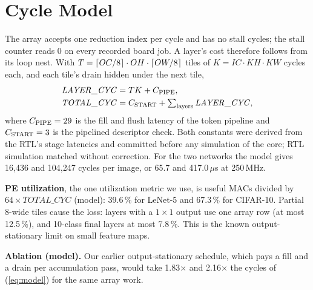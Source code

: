\section{Cycle Model}\label{sec:model}
The array accepts one reduction index per cycle and has no stall cycles;
the stall counter reads 0 on every recorded board job. A layer's cost
therefore follows from its loop nest.
With
$T = \left\lceil OC/8 \right\rceil \cdot OH \cdot \left\lceil OW/8 \right\rceil$ tiles of
$K = IC \cdot KH \cdot KW$ cycles each, and each tile's drain hidden under
the next tile,
\begin{align}
\mathit{LAYER\_CYC} &= T K + C_{\mathrm{PIPE}}, \label{eq:model}\\
\mathit{TOTAL\_CYC} &= C_{\mathrm{START}} + \textstyle\sum_{\text{layers}} \mathit{LAYER\_CYC},\nonumber
\end{align}
where $C_{\mathrm{PIPE}} = 29$ is the fill and flush latency of the token pipeline and
$C_{\mathrm{START}} = 3$ is the pipelined descriptor check. Both constants were derived
from the RTL's stage latencies and committed before any simulation of the
core; RTL simulation matched without correction.
For the two networks the model gives 16,436 and 104,247 cycles per image,
or 65.7 and 417.0\,$\mu$s at 250\,MHz.

\textbf{PE utilization}, the one utilization metric we use, is useful MACs
divided by $64 \times \mathit{TOTAL\_CYC}$ (model): 39.6\,\% for LeNet-5 and
67.3\,\% for CIFAR-10. %
Partial 8-wide tiles cause the loss: layers with a $1{\times}1$ output use
one array row (at most 12.5\,\%), and 10-class final layers at most
7.8\,\%. This is the known output-stationary limit on small feature maps.

\textbf{Ablation (model).} Our earlier output-stationary schedule, which pays
a fill and a drain per accumulation pass, would take 1.83$\times$ and
2.16$\times$ the cycles of (\ref{eq:model}) for the same array work.
